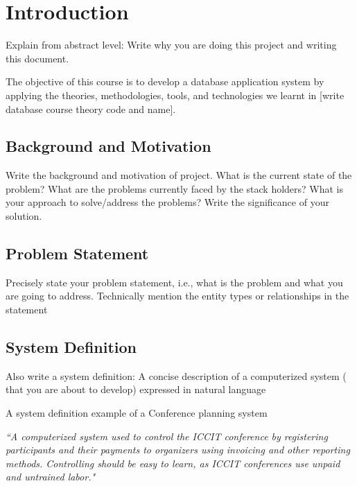
\section{Introduction}\label{sec:introduction}
Explain from abstract level:
Write why you are doing this project and writing this document. 

The objective of this course is to develop a database application system by applying the theories, methodologies, tools, and technologies we learnt in [write database course theory code and name].  




\subsection{Background and Motivation}\label{subsec:bm}
Write the background and motivation of project. What is the current state of the problem? What are the problems currently faced by the stack holders? What is your approach to solve/address the problems? Write the significance of your solution.   

\subsection{Problem Statement}\label{subsec:ps} Precisely state your problem statement, i.e., what is the problem and what you are going to address. Technically mention the entity types or relationships in the statement

\subsection{System Definition}\label{subsec:sd} 
Also write a system definition: A concise description of a computerized system ( that you are about to develop) expressed in natural language

A system definition example of a Conference planning system

\textit{``A computerized system used to control the ICCIT conference by registering participants and their payments to organizers using invoicing and other reporting methods. Controlling should be easy to learn, as ICCIT conferences use unpaid and untrained labor."}


